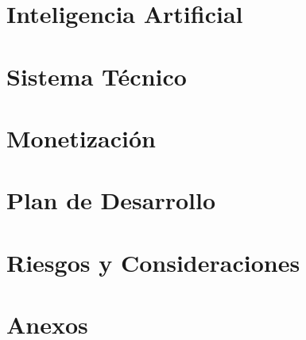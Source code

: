 \documentclass[a4paper,12pt]{article}
\begin{document}
\section{Inteligencia Artificial}



\newpage

\section{Sistema Técnico}



\newpage

\section{Monetización}

\newpage

\section{Plan de Desarrollo}


\newpage

\section{Riesgos y Consideraciones}

\newpage

\section{Anexos}




\end{document}
